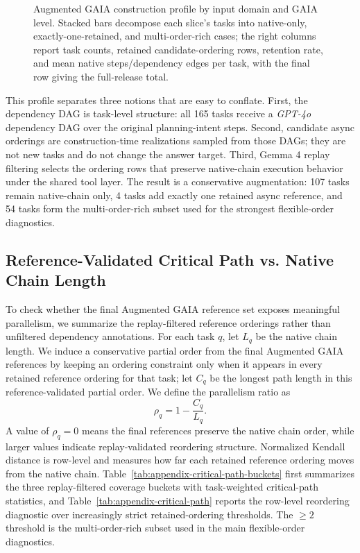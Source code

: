 \documentclass{article}
\providecommand{\model}[1]{\emph{#1}}
\begin{document}
\begin{figure}[H]
{}
\caption{Augmented GAIA construction profile by input domain and GAIA level. Stacked bars decompose each slice's tasks into native-only, exactly-one-retained, and multi-order-rich cases; the right columns report task counts, retained candidate-ordering rows, retention rate, and mean native steps/dependency edges per task, with the final row giving the full-release total.}
\label{fig:appendix-augmented-gaia-construction-profile}
\end{figure}

This profile separates three notions that are easy to conflate. First, the dependency DAG is task-level structure: all 165 tasks receive a \model{GPT-4o} dependency DAG over the original planning-intent steps. Second, candidate async orderings are construction-time realizations sampled from those DAGs; they are not new tasks and do not change the answer target. Third, Gemma 4 replay filtering selects the ordering rows that preserve native-chain execution behavior under the shared tool layer. The result is a conservative augmentation: 107 tasks remain native-chain only, 4 tasks add exactly one retained async reference, and 54 tasks form the multi-order-rich subset used for the strongest flexible-order diagnostics.

\subsection{Reference-Validated Critical Path vs. Native Chain Length}
\label{subsec:appendix-critical-path-profile}

To check whether the final Augmented GAIA reference set exposes meaningful
parallelism, we summarize the replay-filtered reference orderings rather than
unfiltered dependency annotations. For each task $q$, let $L_q$ be the native
chain length. We induce a conservative partial order from the final Augmented
GAIA references by keeping an ordering constraint only when it appears in every
retained reference ordering for that task; let $C_q$ be the longest path length
in this reference-validated partial order. We define the parallelism ratio as
\[
  \rho_q = 1 - \frac{C_q}{L_q}.
\]
A value of $\rho_q=0$ means the final references preserve the native chain
order, while larger values indicate replay-validated reordering structure.
Normalized Kendall distance is row-level and measures how far each retained
reference ordering moves from the native chain. Table~\ref{tab:appendix-critical-path-buckets}
first summarizes the three replay-filtered coverage buckets with task-weighted
critical-path statistics, and Table~\ref{tab:appendix-critical-path} reports the
row-level reordering diagnostic over increasingly strict retained-ordering
thresholds. The $\geq 2$ threshold is the multi-order-rich subset used in the
main flexible-order diagnostics.
\end{document}
